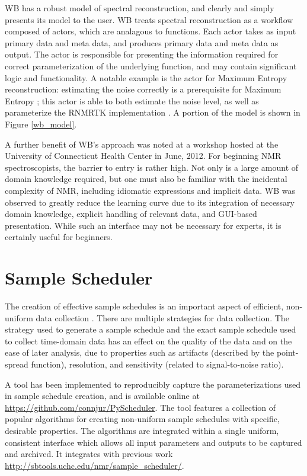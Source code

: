 WB has a robust model of spectral reconstruction, and clearly and simply
presents its model to the user.  WB
treats spectral reconstruction as a workflow composed of actors, which are
analagous to functions.  Each actor takes as input primary data and meta data,
and produces primary data and meta data as output.  The actor is responsible
for presenting the information required for correct parameterization of the
underlying function, and may contain significant logic and functionality.  A
notable example is the actor for Maximum Entropy reconstruction:  estimating
the noise correctly is a prerequisite for Maximum Entropy \cite{mobli2010non};
this actor is able to both estimate the noise level, as well as parameterize
the RNMRTK implementation \cite{rnmrtk}.  A portion of the model is shown
in Figure \ref{wb_model}.

A further benefit of WB's approach was noted at a workshop
hosted at the University of Connecticut Health Center in June, 2012.  For
beginning NMR spectroscopists, the barrier to entry is rather high.  Not only
is a large amount of domain knowledge required, but one must also be familiar
with the incidental complexity of NMR, including idiomatic expressions and
implicit data.  WB was observed to greatly reduce the learning
curve due to its integration of necessary domain knowledge, explicit handling
of relevant data, and GUI-based presentation.  While such an interface may 
not be necessary for experts, it is certainly useful for beginners.



\section{Sample Scheduler}
The creation of effective sample schedules is an important aspect of efficient,
non-uniform data collection 
\cite{maciejewski2011random, rovnyak2004accelerated, mobli2010non}.  There
are multiple strategies for data collection.  The strategy used to generate
a sample schedule and the exact sample schedule used to collect time-domain
data has an effect on the quality of the data and on the ease of later 
analysis, due to properties such as artifacts (described by the point-spread
function), resolution, and sensitivity (related to signal-to-noise ratio).

A tool has been implemented to reproducibly capture the parameterizations
used in sample schedule creation, and is available online at
\url{https://github.com/connjur/PyScheduler}.  The tool features a 
collection of popular algorithms for creating non-uniform sample schedules
with specific, desirable properties.  The algorithms are integrated within
a single uniform, consistent interface which allows all input parameters
and outputs to be captured and archived.  It integrates with previous work
\url{http://sbtools.uchc.edu/nmr/sample_scheduler/}.

